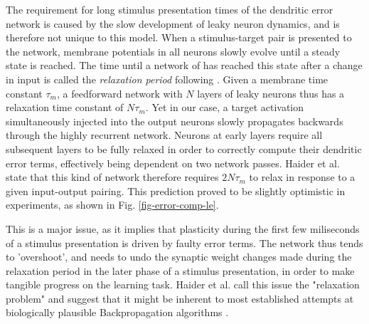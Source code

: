 The requirement for long stimulus presentation times of the dendritic error network is caused by the slow development of
leaky neuron dynamics, and is therefore not unique to this model. When a stimulus-target pair is presented to the
network, membrane potentials in all neurons slowly evolve until a steady state is reached. The time until a network of
has reached this state after a change in input is called the \textit{relaxation period} following \cite{Haider2021}.
Given a membrane time constant $\tau_m$, a feedforward network with $N$ layers of leaky neurons thus has a relaxation
time constant of $N \tau_m$. Yet in our case, a target activation simultaneously injected into the output neurons slowly
propagates backwards through the highly recurrent network. Neurons at early layers require all subsequent layers to be
fully relaxed in order to correctly compute their dendritic error terms, effectively being dependent on two network
passes. Haider et al. state that this kind of network therefore requires $2N\tau_m$ to relax in response to a given
input-output pairing. This prediction proved to be slightly optimistic in experiments, as shown in Fig.
\ref{fig-error-comp-le}.

This is a major issue, as it implies that plasticity during the first few miliseconds of a stimulus presentation is
driven by faulty error terms. The network thus tends to 'overshoot', and needs to undo the synaptic weight changes made
during the relaxation period in the later phase of a stimulus presentation, in order to make tangible progress on the
learning task. Haider et al. call this issue the "relaxation problem" and suggest that it might be inherent to most
established attempts at biologically plausible Backpropagation algorithms
\citep{Whittington2017,guerguiev2017towards,sacramento2018dendritic,millidge2020activation}.



